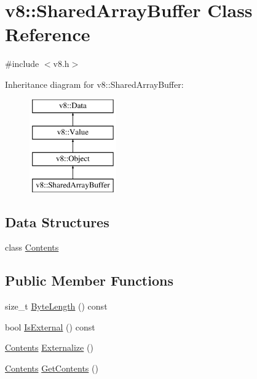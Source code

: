 \hypertarget{classv8_1_1SharedArrayBuffer}{}\section{v8\+:\+:Shared\+Array\+Buffer Class Reference}
\label{classv8_1_1SharedArrayBuffer}


{\ttfamily \#include $<$v8.\+h$>$}

Inheritance diagram for v8\+:\+:Shared\+Array\+Buffer\+:\begin{figure}[H]
\begin{center}
\leavevmode
\includegraphics[height=4.000000cm]{classv8_1_1SharedArrayBuffer}
\end{center}
\end{figure}
\subsection*{Data Structures}
\begin{DoxyCompactItemize}
\item 
class \hyperlink{classv8_1_1SharedArrayBuffer_1_1Contents}{Contents}
\end{DoxyCompactItemize}
\subsection*{Public Member Functions}
\begin{DoxyCompactItemize}
\item 
size\+\_\+t \hyperlink{classv8_1_1SharedArrayBuffer_a09cfb461e2f3f8e1fca53a4a2fbfd8df}{Byte\+Length} () const 
\item 
bool \hyperlink{classv8_1_1SharedArrayBuffer_a37e7ba1ed5a1422af9928697ea6a960b}{Is\+External} () const 
\item 
\hyperlink{classv8_1_1SharedArrayBuffer_1_1Contents}{Contents} \hyperlink{classv8_1_1SharedArrayBuffer_afe025bbf668e64439cfc0044b353eb41}{Externalize} ()
\item 
\hyperlink{classv8_1_1SharedArrayBuffer_1_1Contents}{Contents} \hyperlink{classv8_1_1SharedArrayBuffer_af5a160b645c5c674450d9501697c2cf4}{Get\+Contents} ()
\end{DoxyCompactItemize}
